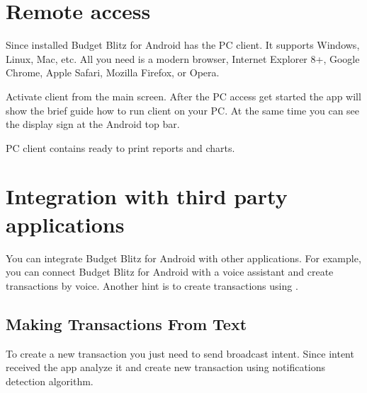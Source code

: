 \documentclass[a4paper,10pt,english]{sphinxmanual}
\begin{document}
\chapter{Remote access}
\label{\detokenize{remote-access:remote-access}}\label{\detokenize{remote-access:chapter-remote-access}}\label{\detokenize{remote-access::doc}}
\sphinxAtStartPar
Since installed Budget Blitz for Android has the PC client. It supports Windows, Linux, Mac, etc. All you need is
a modern browser, Internet Explorer 8+, Google Chrome, Apple Safari, Mozilla Firefox, or Opera.

\noindent{}

\noindent{}

\noindent{}

\sphinxAtStartPar
Activate client from the main screen. After the PC access get started the app will show
the brief guide how to run client on your PC. At the same time you can see the display sign
at the Android top bar.

\sphinxAtStartPar
PC client contains ready to print reports and charts.

\sphinxstepscope


\chapter{Integration with third party applications}
\label{\detokenize{api:integration-with-third-party-applications}}\label{\detokenize{api:chapter-api}}\label{\detokenize{api::doc}}
\sphinxAtStartPar
You can integrate Budget Blitz for Android with other applications. For example, you can connect Budget Blitz for Android
with a voice assistant and create transactions by voice. Another hint is to create
transactions using .


\section{Making Transactions From Text}
\label{\detokenize{api:making-transactions-from-text}}
\sphinxAtStartPar
To create a new transaction you just need to send broadcast intent. Since intent received the app analyze it
and create new transaction using notifications detection algorithm.
\end{document}
